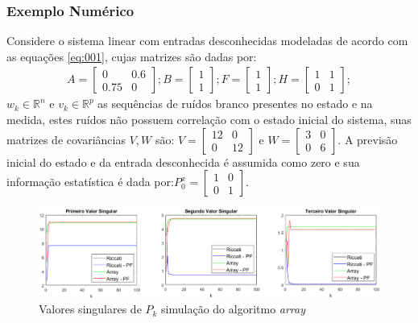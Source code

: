\begin{frame}
	\frametitle{Exemplo Numérico}
	Considere o sistema linear com entradas desconhecidas modeladas de acordo com as equações \eqref{eq:001}, cujas matrizes são dadas por:
	\begin{align*}\label{matrizesExemplos}
		A = \begin{bmatrix} 0 & 0.6\\ 0.75 & 0 \end{bmatrix};
		B = \begin{bmatrix}  1 \\ 1\end{bmatrix};
		F = \begin{bmatrix}  1 \\ 1\end{bmatrix};
		H = \begin{bmatrix}  1 & 1\\ 0 & 1\end{bmatrix};
	\end{align*}
	$w_{k} \in \mathbb{R}^{n}$ e $v_{k} \in \mathbb{R}^{p}$ as sequências de ruídos branco presentes no estado e na medida, estes ruídos não possuem correlação com o estado inicial do sistema, suas matrizes de covariâncias $V, W$ são:
	$V = \begin{bmatrix}  12 & 0\\ 0 & 12 \end{bmatrix}$ e $W = \begin{bmatrix}  3 & 0\\ 0 & 6 \end{bmatrix}$. A previsão inicial do estado e da entrada desconhecida é assumida como zero e sua informação estatística é dada por:$P^{x}_{0} = \begin{bmatrix}  1 & 0\\ 0 & 1 \end{bmatrix}$.
\end{frame}

\begin{frame}
	\begin{figure}
		\centering
		\includegraphics[width=1.05\textwidth]{figuras/valores-singular-color}
		\caption{Valores singulares de $P_{k}$ simulação do algoritmo \textit{array}}
		\label{fig:singular-array}
	\end{figure}
\end{frame}

